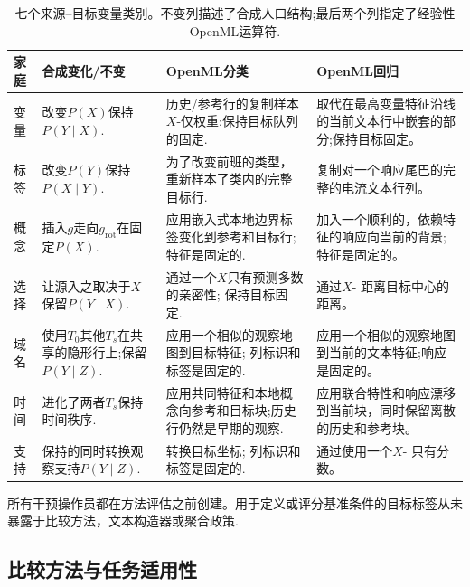 \begin{table}[H]
  \caption{七个来源--目标变量类别。不变列描述了合成人口结构;最后两个列指定了经验性OpenML运算符.}
  \label{tab:shift-transformations}
  \centering
  \scriptsize
  \setlength{\tabcolsep}{2.5pt}
  \begin{tabular}{@{}>{\raggedright\arraybackslash}p{}
                      >{\raggedright\arraybackslash}p{}
                      >{\raggedright\arraybackslash}p{}
                      >{\raggedright\arraybackslash}p{}@{}}
    \toprule 家庭&合成变化/不变&OpenML分类&OpenML回归\\
    \midrule 变量&改变$P(X)$保持$P(Y\mid X)$.
      &历史/参考行的复制样本$X$-仅权重;保持目标队列的固定.&取代在最高变量特征沿线的当前文本行中嵌套的部分;保持目标固定。\\
标签&改变$P(Y)$保持$P(X\mid Y)$.
      &为了改变前班的类型，重新样本了类内的完整目标行.&复制对一个响应尾巴的完整的电流文本行列。\\
概念&插入$g$走向$g_{\mathrm{rot}}$在固定$P(X)$.
      &应用嵌入式本地边界标签变化到参考和目标行;特征是固定的.&加入一个顺利的，依赖特征的响应向当前的背景;特征是固定的。\\
选择&让源入之取决于$X$保留$P(Y\mid X)$.
      &通过一个$X$只有预测多数的亲密性; 保持目标固定.&通过$X$- 距离目标中心的距离。\\
域名&使用$T_0$其他$T_s$在共享的隐形行上;保留$P(Y\mid Z)$.
      &应用一个相似的观察地图到目标特征; 列标识和标签是固定的.&应用一个相似的观察地图到当前的文本特征;响应是固定的。\\
时间&进化了两者$T_s$保持时间秩序.&应用共同特征和本地概念向参考和目标块;历史行仍然是早期的观察.
      &应用联合特性和响应漂移到当前块，同时保留离散的历史和参考块。\\
支持&保持的同时转换观察支持$P(Y\mid Z)$.
      &转换目标坐标; 列标识和标签是固定的.&通过使用一个$X$- 只有分数。\\
    \bottomrule
  \end{tabular}
\end{table}

所有干预操作员都在方法评估之前创建。用于定义或评分基准条件的目标标签从未暴露于比较方法，文本构造器或聚合政策.

\FloatBarrier

\subsection{比较方法与任务适用性}
\label{app:baseline_details}

